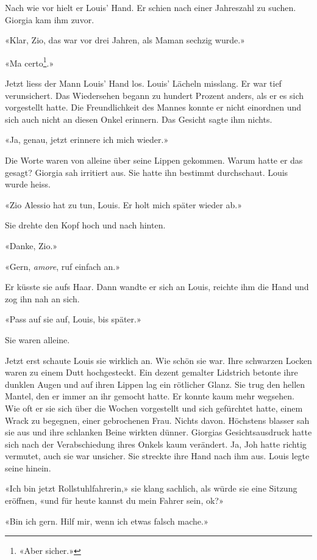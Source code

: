 Nach wie vor hielt er Louis’ Hand. Er schien nach einer Jahreszahl zu
suchen.
Giorgia kam ihm zuvor.

«Klar, Zio, das war vor drei Jahren, als Maman sechzig wurde.»

«Ma certo\footnote{«Aber sicher.»}.»

Jetzt liess der Mann Louis’ Hand los.
Louis’ Lächeln misslang. Er war tief verunsichert. Das Wiedersehen begann zu hundert Prozent anders,
als er es sich vorgestellt hatte. Die Freundlichkeit des Mannes konnte er nicht einordnen und sich auch nicht an diesen Onkel erinnern. Das Gesicht sagte ihm nichts. 

«Ja, genau, jetzt erinnere ich mich wieder.»

Die Worte waren von alleine über seine Lippen gekommen. Warum hatte er
das gesagt? Giorgia sah irritiert aus. Sie hatte ihn bestimmt
durchschaut. Louis wurde heiss.

«Zio Alessio hat zu tun, Louis. Er holt mich später wieder ab.»

Sie drehte den Kopf hoch und nach hinten.

«Danke, Zio.»

«Gern, \emph{amore}, ruf einfach an.»

Er küsste sie aufs Haar.
Dann wandte er sich an Louis, reichte ihm die Hand und zog ihn nah an
sich.

«Pass auf sie auf, Louis, bis später.»

\sectionbreak

Sie waren alleine. 

Jetzt erst schaute Louis sie wirklich an. Wie schön
sie war. Ihre schwarzen Locken waren zu einem Dutt hochgesteckt. Ein
dezent gemalter Lidstrich betonte ihre dunklen Augen und auf ihren
Lippen lag ein rötlicher Glanz. Sie trug den hellen Mantel, den er immer
an ihr gemocht hatte. Er konnte kaum mehr wegsehen. Wie oft er sie sich
über die Wochen vorgestellt und sich gefürchtet hatte, einem Wrack zu
begegnen, einer gebrochenen Frau. Nichts davon. Höchstens blasser sah
sie aus und ihre schlanken Beine wirkten dünner.
Giorgias Gesichtsausdruck hatte sich nach der Verabschiedung ihres
Onkels kaum verändert. Ja, Joh hatte richtig vermutet, auch sie war unsicher.
Sie streckte ihre Hand nach ihm aus. Louis legte seine hinein.

«Ich bin jetzt Rollstuhlfahrerin,» sie klang sachlich, als würde sie eine Sitzung eröffnen, 
«und für heute kannst du mein Fahrer sein, ok?»

«Bin ich gern. Hilf mir, wenn ich etwas falsch mache.»

